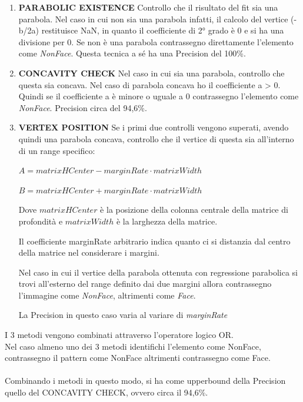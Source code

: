 \documentclass[
  italian,
]{article}
\begin{document}
\begin{enumerate}

\item
\textbf{PARABOLIC EXISTENCE}
\newline
Controllo che il risultato del fit sia una parabola. Nel caso in cui non sia una parabola infatti, il calcolo del vertice (-b/2a) restituisce NaN, in quanto il coefficiente di 2° grado è 0 e si ha una divisione per 0.
Se non è una parabola contrassegno direttamente l'elemento come \emph{NonFace}.
Questa tecnica a sé ha una Precision del 100\%.

\item
\textbf{CONCAVITY CHECK}
\newline
Nel caso in cui sia una parabola, controllo che questa sia concava.
Nel caso di parabola concava ho il coefficiente a > 0.
Quindi se il coefficiente a è minore o uguale a 0 contrassegno l'elemento come \emph{NonFace}.
\newline
Precision circa del 94,6\%.

\item
\textbf{VERTEX POSITION}
\newline
Se i primi due controlli vengono superati, avendo quindi una parabola concava, controllo che il vertice di questa sia all'interno di un range specifico:

\(A = matrixHCenter - marginRate \cdot matrixWidth\)

\(B = matrixHCenter + marginRate \cdot matrixWidth\)

Dove \(matrixHCenter\) è la posizione della colonna centrale della
matrice di profondità e \(matrixWidth\) è la larghezza della matrice.

Il coefficiente marginRate arbitrario indica quanto ci si distanzia
dal centro della matrice nel considerare i margini.

Nel caso in cui il vertice della parabola ottenuta con regressione
parabolica si trovi all'esterno del range definito dai due margini allora contrassegno l'immagine come \emph{NonFace}, altrimenti
come \emph{Face}.

La Precision in questo caso varia al variare di \emph{marginRate}
\end{enumerate}

I 3 metodi vengono combinati attraverso l'operatore logico OR.\\
Nel caso almeno uno dei 3 metodi identifichi l'elemento come NonFace, contrassegno il pattern come NonFace altrimenti contrassegno come Face.\\
\\
Combinando i metodi in questo modo, si ha come upperbound della Precision quello del CONCAVITY CHECK, ovvero circa il 94,6\%.
\end{document}
